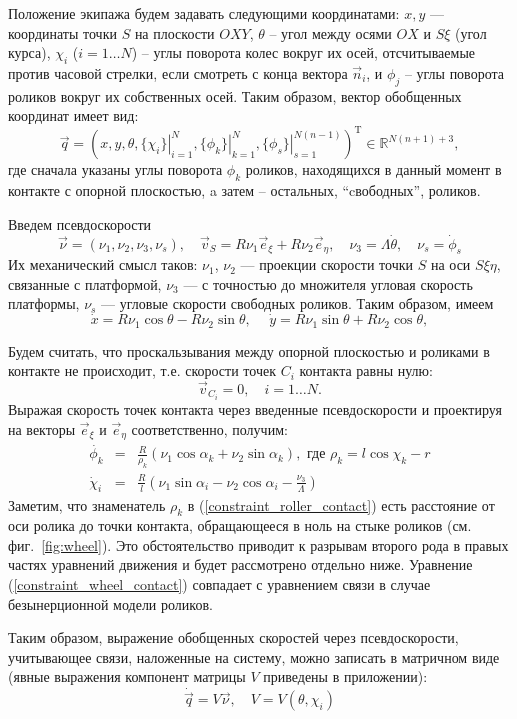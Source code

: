 Положение экипажа будем задавать следующими координатами:
$x, y$ --- координаты точки $S$ на плоскости $OXY$, $\theta$ -- угол между осями $OX$ и $S\xi$ (угол курса),
$\chi_i$ ($i = 1\dots N$) -- углы поворота колес вокруг их осей, отсчитываемые против часовой стрелки, если смотреть с конца вектора $\vec{n}_i$, и $\phi_j$ -- углы поворота роликов вокруг их собственных осей.
Таким образом, вектор обобщенных координат имеет вид:
$$\vec{q} = (
    x, y, \theta,
    \left.\{\chi_i\}\right|_{i=1}^N ,
    \left.\{\phi_k\}\right|_{k=1}^N,
    \left.\{\phi_s\}\right|_{s=1}^{N(n - 1)}
)^{\mathop{T}}\in\mathbb{R}^{N(n+1) + 3},$$ 
где сначала указаны углы поворота $\phi_k$ роликов, находящихся в данный момент в контакте с опорной плоскостью, a затем -- остальных, ``cвободных'', роликов.

Введем псевдоскорости
$$\vec{\nu} = (\nu_1, \nu_2, \nu_3, \nu_s), \quad \vec{v}_S = R\nu_1\vec{e}_\xi + R\nu_2\vec{e}_\eta, \quad \nu_3 = \Lambda\dot{\theta},\quad \nu_s = \dot{\phi}_s$$
Их механический смысл таков: $\nu_1$, $\nu_2$ --- проекции скорости точки $S$ на оси $S\xi\eta$, связанные с платформой, $\nu_3$ --- с точностью до множителя угловая скорость платформы, $\nu_s$ --- угловые скорости свободных роликов. Таким образом, имеем
$$ \dot{x} = R \nu_1\cos\theta-R\nu_2\sin\theta, \hspace{15pt} \dot{y} = R\nu_1\sin\theta+R\nu_2\cos\theta,$$

Будем считать, что проскальзывания между опорной плоскостью и роликами в контакте не происходит, т.е.
скорости точек $C_i$ контакта равны нулю:
$$\vec{v}_{C_i} = 0,\quad i = 1\dots N.$$
Выражая скорость точек контакта через введенные псевдоскорости и проектируя на векторы $\vec{e}_\xi$ и $\vec{e}_\eta$ соответственно, получим:
\begin{eqnarray}
\dot{\phi_k} &=& \frac{R}{\rho_k }(\nu_1\cos\alpha_k + \nu_2\sin\alpha_k),\text{ где } \rho_k  = l\cos\chi_k - r \label{constraint_roller_contact}\\
\dot{\chi}_i &=& \frac{R}{l}(\nu_1\sin\alpha_i - \nu_2\cos\alpha_i - \frac{\nu_3}{\Lambda})\label{constraint_wheel_contact}
\end{eqnarray}
Заметим, что знаменатель $\rho_k$ в (\ref{constraint_roller_contact}) есть расстояние от оси ролика до точки контакта, обращающееся в ноль на стыке роликов (см. фиг.~\ref{fig:wheel}). Это обстоятельство приводит к разрывам второго рода в правых частях уравнений движения и будет рассмотрено отдельно ниже.
Уравнение (\ref{constraint_wheel_contact}) совпадает с уравнением связи в случае безынерционной модели роликов. 

Таким образом, выражение обобщенных скоростей через псевдоскорости, учитывающее связи, наложенные на систему, можно записать в матричном виде (явные выражения компонент матрицы $V$ приведены в приложении):
\begin{equation}
    \dot{\vec{q}} = V\vec{\nu},\quad V = V(\theta,\chi_i)
\end{equation}
